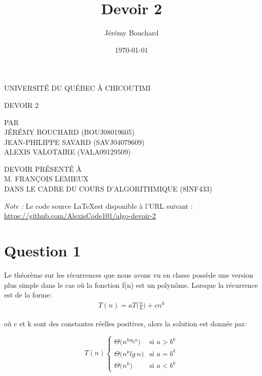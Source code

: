 \documentclass[12pt]{article}
\title{Devoir 2}
\author{Jérémy Bouchard}
\date{\today}
\begin{document}
\begin{titlepage}
	\doublespacing
	\centering

	UNIVERSITÉ DU QUÉBEC À CHICOUTIMI \\

	\vspace{4.7cm}

	DEVOIR 2 \\

	\vspace{4.7cm}

	PAR \\
	JÉRÉMY BOUCHARD (BOUJ08019605) \\
	JEAN-PHILIPPE SAVARD (SAVJ04079609) \\
	ALEXIS VALOTAIRE (VALA09129509) \\

	\vspace{4.7cm}

	DEVOIR PRÉSENTÉ À \\
	M. FRANÇOIS LEMIEUX \\
	DANS LE CADRE DU COURS D'ALGORITHMIQUE (8INF433)
\end{titlepage}

\newpage

\textit{Note :} Le code source \LaTeX \:est disponible à l'URL suivant : \\
\url{https://github.com/AlexisCode101/algo-devoir-2}

\newpage

\onehalfspacing

\section*{Question 1}
Le théorème sur les récurrences que nous avons vu en classe possède
une version plus simple dans le cas où la fonction f(n) est un polynôme.
Lorsque la récurrence est de la forme:
\begin{align*}
	T(n) = aT\Big(\frac{n}{b}\Big) + cn^k
\end{align*}

où c et k sont des constantes réelles positives, alors la solution est
donnée par:

\[T(n) \begin{cases}
      \Theta\big(n^{log_ba}\big) & \text{si } a>b^k \\
      \Theta\big(n^klg \: n\big) & \text{si } a=b^k \\
      \Theta\big(n^k\big) & \text{si } a<b^k
   \end{cases}
\]
\end{document}
